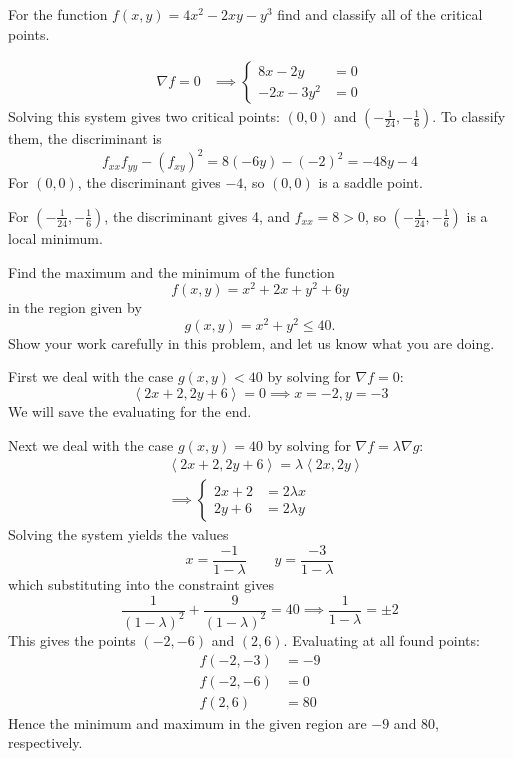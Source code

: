 \documentclass[12pt,answers]{exam}
\newcommand{\vect}[1]{\left\langle #1\right\rangle}
\begin{document}
\begin{questions}
	\newpage
	\question[14]
	For the function $f(x,y) = 4x^2 - 2xy - y^3$ find and classify all of the critical points.
	\begin{solution}
		\begin{align*}
			\nabla f = 0
			&\implies
			\left\{
				\begin{aligned}
					8x-2y &= 0 \\ 
					-2x -3y^2 &= 0
				\end{aligned}
			\right.
		\end{align*}
		Solving this system gives two critical points: 
		$(0,0)$ and $(-\frac1{24}, -\frac16)$.
		To classify them, the discriminant is
		\[
			f_{xx} f_{yy} - (f_{xy})^2 
			= 8(-6y) - (-2)^2 = -48y - 4
		\]
		For $(0,0)$, the discriminant gives $-4$, so $(0,0)$ is a saddle point.

		For $(-\frac1{24}, -\frac16)$, the discriminant gives 4, and $f_{xx} = 8 > 0$, so $(-\frac1{24}, -\frac16)$ is a local minimum.
	\end{solution}

	\newpage
	\question[20]
	Find the maximum and the minimum of the function
	\[
		f(x,y) = x^2 + 2x + y^2 + 6y
	\]
	in the region given by 
	\[
		g(x,y) = x^2 + y^2 \le 40.
	\]
	Show your work carefully in this problem, and let us know what you are doing.
	\begin{solution}
		First we deal with the case $g(x, y) < 40$ by solving for $\nabla f =0$:
		\[
			\vect{2x+2, 2y+6} = 0 \implies x=-2, y=-3
		\]
		We will save the evaluating for the end.

		Next we deal with the case $g(x, y) = 40$ by solving for $\nabla f = \lambda \nabla g$:
		\[
			\begin{aligned}
			&\vect{2x+2, 2y+6} = \lambda \vect{2x, 2y} \\
			& \implies \left\{
				\begin{aligned}
					2x+2 &= 2\lambda x\\
					2y+6 &= 2\lambda y
				\end{aligned}
			\right.
			\end{aligned}
		\]
		Solving the system yields the values
		\[
			x = \frac{-1}{1-\lambda} \qquad y = \frac{-3}{1-\lambda}
		\]
		which substituting into the constraint gives
		\[
			\frac{1}{(1-\lambda)^2} + \frac{9}{(1-\lambda)^2} = 40 \implies \frac{1}{1-\lambda} = \pm 2
		\]
		This gives the points $(-2, -6)$ and $(2, 6)$.
		Evaluating at all found points:
		\begin{align*}
			f(-2, -3) &= -9\\ 
			f(-2, -6) &= 0\\
			f(2, 6) &= 80 
		\end{align*}
		Hence the minimum and maximum in the given region are $-9$ and 80, respectively.
	\end{solution}


\end{questions}
\end{document}
